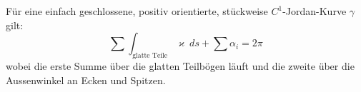 \begin{satz}
%
    Für eine einfach geschlossene, positiv orientierte, stückweise $C^1$-Jordan-Kurve $\gamma$ gilt:
    \[
        \sum \int_{\text{glatte Teile}} \varkappa \ ds + \sum \alpha_i = 2\pi
    \]
    wobei die erste Summe über die glatten Teilbögen läuft und die zweite über die Aussenwinkel an Ecken und Spitzen.
\end{satz}
